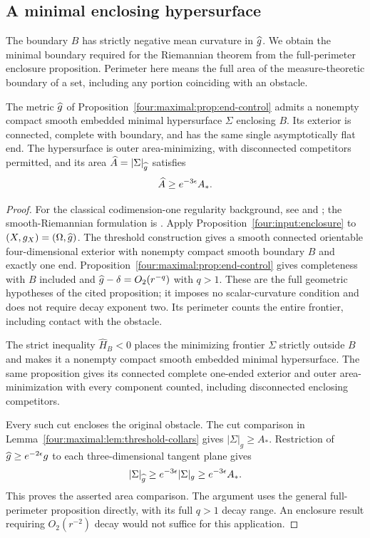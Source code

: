 \subsection{A minimal enclosing hypersurface}

The boundary $B$ has strictly negative mean curvature in $\widehat g$.
We obtain the minimal boundary required for the Riemannian theorem
from the full-perimeter enclosure proposition.  Perimeter here means the full
area of the measure-theoretic boundary of a set, including any portion
coinciding with an obstacle.

\begin{lemma}\label{four:maximal:lem:minimal-enclosure}
The metric $\widehat g$ of Proposition~\ref{four:maximal:prop:end-control} admits a
nonempty compact smooth embedded minimal hypersurface $\Sigma$
enclosing $B$.  Its exterior is connected, complete with boundary,
and has the same single asymptotically flat end.  The hypersurface is
outer area-minimizing, with disconnected competitors permitted, and
its area $\widehat A=|\Sigma|_{\widehat g}$ satisfies
\begin{equation}\label{four:maximal:end:area-comparison}
 \widehat A\ge e^{-3\epsilon}A_*.
\end{equation}
\end{lemma}

\begin{proof}
For the classical codimension-one regularity background, see
\cite[Sections~5.3--5.4]{Federer1969} and \cite{Federer1970}; the
smooth-Riemannian formulation is
\cite[Chapter~7, \S5, Theorem~5.8, p.~200]{Simon2014}.
Apply Proposition~\ref{four:input:enclosure} to
$(X,g_X)=(\Omega,\widehat g)$.  The threshold construction gives a smooth
connected orientable four-dimensional exterior with nonempty compact
smooth boundary $B$ and exactly one end.  Proposition~\ref{four:maximal:prop:end-control}
gives completeness with $B$ included and
$\widehat g-\delta=O_2(r^{-q})$ with $q>1$.  These are the full geometric
hypotheses of the cited proposition; it imposes no scalar-curvature
condition and does not require decay exponent two.  Its perimeter counts
the entire frontier, including contact with the obstacle.

The strict inequality $\widehat H_B<0$ places the minimizing frontier
$\Sigma$ strictly outside $B$ and makes it a nonempty compact smooth
embedded minimal hypersurface.  The same proposition gives its connected
complete one-ended exterior and outer area-minimization with every
component counted, including disconnected enclosing competitors.

Every such cut encloses the original obstacle.  The cut comparison in
Lemma~\ref{four:maximal:lem:threshold-collars} gives $|\Sigma|_g\ge A_*$.
Restriction of $\widehat g\ge e^{-2\epsilon}g$ to each three-dimensional tangent
plane gives
\[
 |\Sigma|_{\widehat g}\ge e^{-3\epsilon}|\Sigma|_g
                    \ge e^{-3\epsilon}A_*.
\]
This proves the asserted area comparison.  The argument uses the
general full-perimeter proposition directly, with its full $q>1$ decay range.  An enclosure result requiring
$O_2(r^{-2})$ decay would not suffice for this application.
\end{proof}

